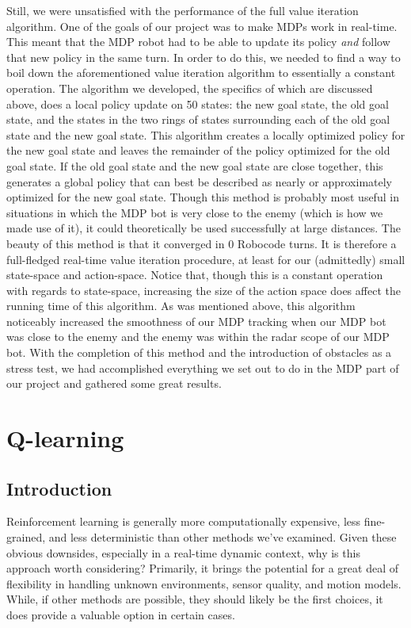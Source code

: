 \documentclass{aiaa-tc}%
\begin{document}
Still, we were unsatisfied with the performance of the full value iteration algorithm. One of the goals of our project was to make MDPs work in real-time. This meant that the MDP robot had to be able to update its policy \emph{and} follow that new policy in the same turn. In order to do this, we needed to find a way to boil down the aforementioned  value iteration algorithm to essentially a constant operation. The algorithm we developed, the specifics of which are discussed above, does a local policy update on 50 states: the new goal state, the old goal state, and the states in the two rings of states surrounding each of the old goal state and the new goal state. This algorithm creates a locally optimized policy for the new goal state and leaves the remainder of the policy optimized for the old goal state. If the old goal state and the new goal state are close together, this generates a global policy that can best be described as nearly or approximately optimized for the new goal state. Though this method is probably most useful in situations in which the MDP bot is very close to the enemy (which is how we made use of it), it could theoretically be used successfully at large distances. The beauty of this method is that it converged in 0 Robocode turns. It is therefore a full-fledged real-time value iteration procedure, at least for our (admittedly) small state-space and action-space. Notice that, though this is a constant operation with regards to state-space, increasing the size of the action space does affect the running time of this algorithm. As was mentioned above, this algorithm noticeably increased the smoothness of our MDP tracking when our MDP bot was close to the enemy and the enemy was within the radar scope of our MDP bot. With the completion of this method and the introduction of obstacles as a stress test, we had accomplished everything we set out to do in the MDP part of our project and gathered some great results.
\section{Q-learning}
\label{Q-learning}
\subsection{Introduction}
Reinforcement learning is generally more computationally expensive,
less fine-grained, and less deterministic than other methods we've
examined. Given these obvious downsides, especially in a
real-time dynamic context, why is this approach worth
considering? Primarily, it brings the potential for a great deal of
flexibility in handling unknown environments, sensor quality, and
motion models. While, if other methods are possible, they should likely
be the first choices, it does provide a valuable option in certain
cases. 
\end{document}
